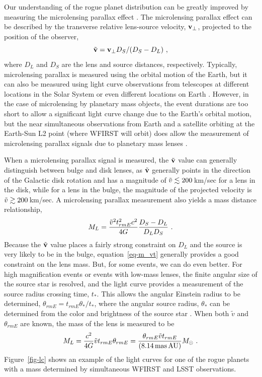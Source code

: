 Our understanding of the rogue planet distribution can be greatly improved
by measuring the microlensing parallax effect \citep{1992ApJ...392..442G,1995ApJ...454L.125A}.
The microlensing parallax effect can be described
by the transverse relative lens-source velocity, ${\bf v}_{\rm \perp}$, projected
to the position of the observer,
\begin{equation}
\tilde{\bf v} = {\bf v}_{\rm \perp} D_S/(D_S-D_L) \ , \label{eq-vp}
\end{equation}
where $D_L$ and $D_S$ are the lens and source distances, respectively.
Typically, microlensing parallax
is measured using the orbital motion of the Earth, but it can also be
measured using light curve observations from telescopes at different locations
in the Solar System \citep{2007ApJ...664..862D,2015ApJ...804...20C} or
even different locations on Earth \citep{2009ApJ...698L.147G}. However, in the
case of microlensing by planetary mass objects, the event durations are
too short to allow a significant light curve change due to the Earth's
orbital motion, but the near simultaneous observations from Earth and a
satellite orbiting at the Earth-Sun L2 point (where WFIRST will orbit) does
allow the measurement of microlensing parallax signals due to planetary mass
lenses \citep{2003ApJ...591L..53G}.

When a microlensing parallax signal is measured, the $\tilde{\bf v}$ value
can generally distinguish between bulge and disk lenses, as $\tilde{\bf v}$
generally points in the direction of the Galactic disk rotation and has
a magnitude of $\tilde{v} \lesssim 200\,$km/sec for a lens in the
disk, while for a lens in the bulge, the magnitude of the projected velocity
is $\tilde{v} \gtrsim 200\,$km/sec. A microlensing parallax measurement also
yields a mass distance relationship,
\begin{equation}
   M_L = {\tilde{v}^2 t_{rm E}^2 c^2 \over 4 G} {D_S-D_L \over D_L D_S} \ .
   \label{eq-m_vt}
\end{equation}
Because the $\tilde{\bf v}$ value places a fairly strong constraint
on $D_L$ and the source is very likely to be in the bulge, equation~\ref{eq-m_vt}
generally provides a good constraint on the lens mass. But, for some
events, we can do even better. For high magnification events or events
with low-mass lenses, the finite angular size of the source star is
resolved, and the light curve provides a measurement of the source
radius crossing time, $t_*$. This allows the angular Einstein radius
to be determined, $\theta_{rm E} = t_{rm E} \theta_*/t_*$, where the angular
source radius, $\theta_*$ can be determined from the color and brightness
of the source star \citep{2014AJ....147...47B}. When both $\tilde{v}$ and
$\theta_{rm E}$ are known, the mass of the lens is measured to be
\begin{equation}
M_L = {c^2\over 4G} \tilde{v} t_{rm E} \theta_{rm E} = {\theta_{rm E}\tilde{v} t_{rm E} \over (8.14\,{\rm mas\, AU})} M_{\odot} \ .
\label{eq-m}
\end{equation}
Figure~\ref{fig-lc} shows an example of the light curves for one of the
rogue planets with a mass determined by simultaneous WFIRST and LSST
observations.

